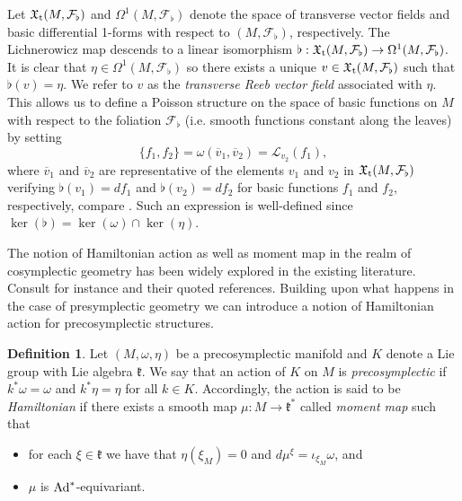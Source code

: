 \documentclass[
  a4paper, 
  reqno, 
  oneside, 
  12pt
]{amsart}
\theoremstyle{definition}
\newtheorem{definition}[theorem]{Definition}
\theoremstyle{remark}
\begin{document}
Let $\mathfrak{X}_\textnormal{t}(M,\mathcal{F}_\flat)$ and $\Omega^1(M,\mathcal{F}_\flat)$ denote the space of transverse vector fields and basic differential 1-forms with respect to $(M,\mathcal{F}_\flat)$, respectively. The Lichnerowicz map descends to a linear isomorphism $\flat:\mathfrak{X}_\textnormal{t}(M,\mathcal{F}_\flat)\to \Omega^1(M,\mathcal{F}_\flat)$. It is clear that $\eta \in \Omega^1(M,\mathcal{F}_\flat)$ so there exists a unique $v\in \mathfrak{X}_\textnormal{t}(M,\mathcal{F}_\flat)$ such that $\flat(v)=\eta$. We refer to $v$ as the \emph{transverse Reeb vector field} associated with $\eta$. This allows us to define a Poisson structure on the space of basic functions on $M$ with respect to the foliation $\mathcal{F}_\flat$ (i.e. smooth functions constant along the leaves) by setting
$$ \lbrace f_1,f_2\rbrace = \omega(\overline{v}_1,\overline{v}_2)=\mathcal{L}_{v_2}(f_1),$$
where $\overline{v}_1$ and $\overline{v}_2$ are representative of the elements $v_1$ and $v_2$ in $\mathfrak{X}_\textnormal{t}(M,\mathcal{F}_\flat)$ verifying $\flat(v_1)=df_1$ and $\flat(v_2)=df_2$ for basic functions $f_1$ and $f_2$, respectively, compare \cite{Bursztyn,LinSjamaar}. Such an expression is well-defined since $\ker(\flat)=\ker(\omega)\cap \ker(\eta)$.

The notion of Hamiltonian action as well as moment map in the realm of cosymplectic geometry has been widely explored in the existing literature. Consult for instance \cite{Albert,BazzoniGoertsches,BazzoniGoertsches2,deLucasRivasVilarinoZawora} and their quoted references. Building upon what happens in the case of presymplectic geometry we can introduce a notion of Hamiltonian action for precosymplectic structures.

\begin{definition}\label{def:HamiltonianPrecocymplectic}
Let $(M,\omega,\eta)$ be a precosymplectic manifold and $K$ denote a Lie group with Lie algebra $\mathfrak{k}$. We say that an action of $K$ on $M$ is \emph{precosymplectic} if $k^\ast \omega=\omega$ and $k^\ast \eta=\eta$ for all $k\in K$. Accordingly, the action is said to be \emph{Hamiltonian} if there exists a smooth map $\mu:M\to \mathfrak{k}^\ast$ called \emph{moment map} such that
\begin{itemize}
\item for each $\xi\in \mathfrak{k}$ we have that $\eta(\xi_M)=0$ and $d\mu^\xi=\iota_{\xi_M}\omega$, and
\item $\mu$ is $\textnormal{Ad}^\ast$-equivariant.
\end{itemize}
\end{definition}
\end{document}
